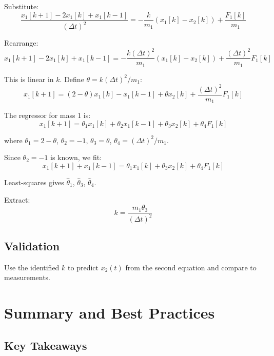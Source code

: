 Substitute:
\begin{equation}
\frac{x_1[k+1] - 2x_1[k] + x_1[k-1]}{(\Delta t)^2} = -\frac{k}{m_1}(x_1[k] - x_2[k]) + \frac{F_1[k]}{m_1}
\end{equation}

Rearrange:
\begin{equation}
x_1[k+1] - 2x_1[k] + x_1[k-1] = -\frac{k(\Delta t)^2}{m_1}(x_1[k] - x_2[k]) + \frac{(\Delta t)^2}{m_1}F_1[k]
\end{equation}

This is linear in $k$. Define $\theta = k(\Delta t)^2 / m_1$:
\begin{equation}
x_1[k+1] = (2 - \theta)x_1[k] - x_1[k-1] + \theta x_2[k] + \frac{(\Delta t)^2}{m_1}F_1[k]
\end{equation}

The regressor for mass 1 is:
\begin{equation}
x_1[k+1] = \theta_1 x_1[k] + \theta_2 x_1[k-1] + \theta_3 x_2[k] + \theta_4 F_1[k]
\end{equation}

where $\theta_1 = 2 - \theta$, $\theta_2 = -1$, $\theta_3 = \theta$, $\theta_4 = (\Delta t)^2/m_1$.

Since $\theta_2 = -1$ is known, we fit:
\begin{equation}
x_1[k+1] + x_1[k-1] = \theta_1 x_1[k] + \theta_3 x_2[k] + \theta_4 F_1[k]
\end{equation}

Least-squares gives $\hat{\theta}_1$, $\hat{\theta}_3$, $\hat{\theta}_4$.

Extract:
\begin{equation}
k = \frac{m_1 \theta_3}{(\Delta t)^2}
\end{equation}

\subsection{Validation}

Use the identified $k$ to predict $x_2(t)$ from the second equation and compare to measurements.

\section{Summary and Best Practices}

\subsection{Key Takeaways}

